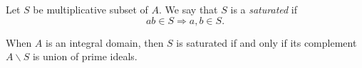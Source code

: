 \documentclass[12pt]{article}
\begin{document}
Let $S$ be multiplicative subset of $A$. We say that $S$ is a \emph{saturated} if
$$ab\in S\Rightarrow  a,b\in S.$$

When $A$ is an integral domain, then $S$ is saturated if and only if its complement $A\backslash S$ is union of prime ideals.
\end{document}
